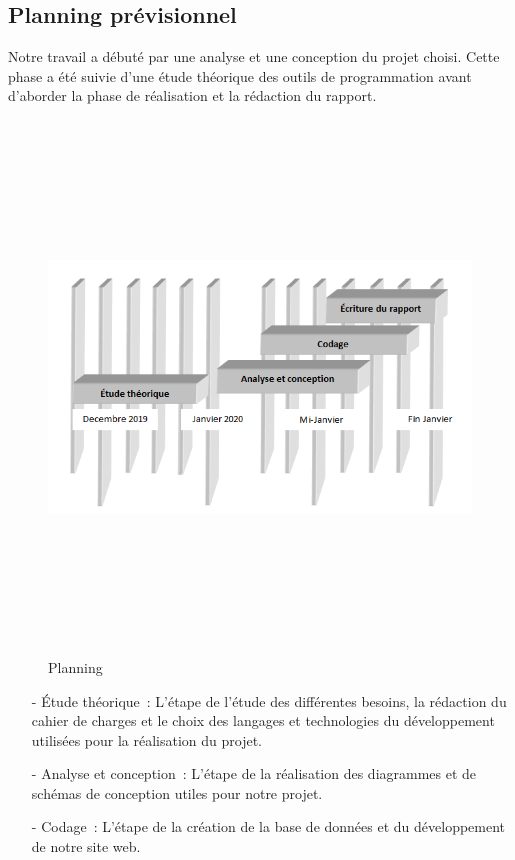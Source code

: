 \documentclass[11.5pt]{report}
\begin{document}
\subsection{Planning prévisionnel} 
Notre travail a débuté par une analyse et une conception du projet choisi. Cette phase a été suivie d’une étude théorique des outils de programmation avant d’aborder la phase de réalisation et la rédaction du rapport. 
\begin{figure}[h]
	
	\begin{center}
		\includegraphics[width=450pt,height=400pt]{planning.png} 
		\caption{Planning}
	\end{center}
	
\end{figure}
\newpage
\begin{itemize}

\item [-] Étude théorique : L’étape de l’étude des différentes besoins, la rédaction du cahier de charges et le choix des langages et technologies du développement utilisées pour la réalisation du projet.
\item [-] Analyse et conception : L’étape de la réalisation des diagrammes et de schémas de conception utiles pour notre projet.
\item [-] Codage : L’étape de la création de la base de données et du développement de notre site web.
\end{itemize}
\end{document}
